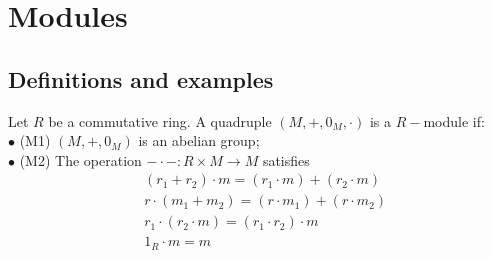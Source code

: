 \documentclass[a4paper]{article}
\begin{document}
\newpage
\section{Modules}

\subsection{Definitions and examples}
\begin{defi}
Let $R$ be a commutative ring. A quadruple $\left(M,+,0_M,\cdot\right)$ is a $R-$module if:\\
$\bullet$ (M1) $\left(M,+,0_M\right)$ is an abelian group;\\
$\bullet$ (M2) The operation $-\cdot-:R\times M\to M$ satisfies
\begin{equation*}
\begin{aligned}
&\left(r_1+ r_2\right)\cdot m = \left(r_1\cdot m\right)+\left(r_2\cdot m\right)\\
&r\cdot\left(m_1 + m_2\right) = \left(r\cdot m_1\right) + \left(r\cdot m_2\right)\\
&r_1\cdot\left(r_2\cdot m\right) = \left(r_1 \cdot r_2\right)\cdot m\\
&1_R \cdot m = m
\end{aligned}
\end{equation*}
\end{defi}
\end{document}
